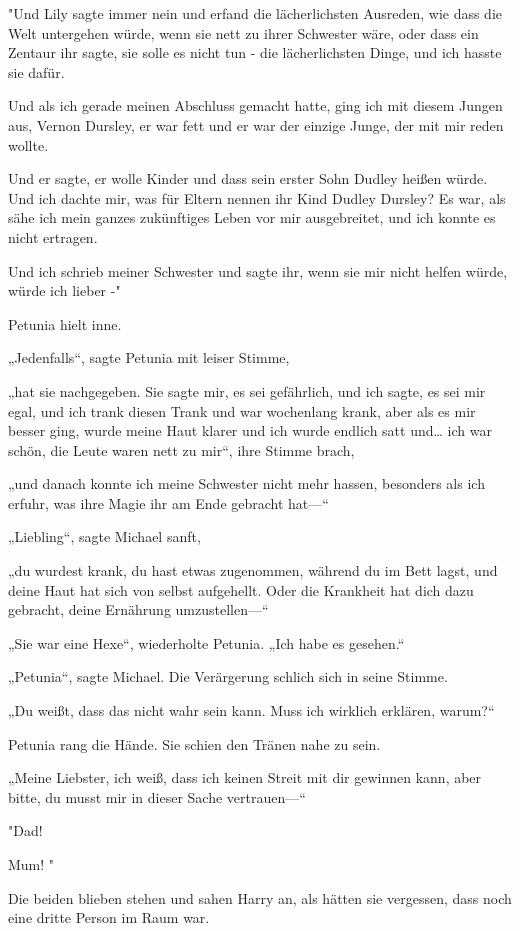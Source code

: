 {"Und Lily sagte immer nein und erfand die lächerlichsten Ausreden, wie dass die Welt untergehen würde, wenn sie nett zu ihrer Schwester wäre, oder dass ein Zentaur ihr sagte, sie solle es nicht tun - die lächerlichsten Dinge, und ich hasste sie dafür.

Und als ich gerade meinen Abschluss gemacht hatte, ging ich mit diesem Jungen aus, Vernon Dursley, er war fett und er war der einzige Junge, der mit mir reden wollte.

Und er sagte, er wolle Kinder und dass sein erster Sohn Dudley heißen würde. Und ich dachte mir, was für Eltern nennen ihr Kind Dudley Dursley? Es war, als sähe ich mein ganzes zukünftiges Leben vor mir ausgebreitet, und ich konnte es nicht ertragen.

Und ich schrieb meiner Schwester und sagte ihr, wenn sie mir nicht helfen würde, würde ich lieber -"

Petunia hielt inne.

„Jedenfalls“, sagte Petunia mit leiser Stimme,

„hat sie nachgegeben. Sie sagte mir, es sei gefährlich, und ich sagte, es sei mir egal, und ich trank diesen Trank und war wochenlang krank, aber als es mir besser ging, wurde meine Haut klarer und ich wurde endlich satt und… ich war schön, die Leute waren nett zu mir“, ihre Stimme brach,

„und danach konnte ich meine Schwester nicht mehr hassen, besonders als ich erfuhr, was ihre Magie ihr am Ende gebracht hat—“

„Liebling“, sagte Michael sanft,

„du wurdest krank, du hast etwas zugenommen, während du im Bett lagst, und deine Haut hat sich von selbst aufgehellt. Oder die Krankheit hat dich dazu gebracht, deine Ernährung umzustellen—“

„Sie war eine Hexe“, wiederholte Petunia. „Ich habe es gesehen.“

„Petunia“, sagte Michael. Die Verärgerung schlich sich in seine Stimme.

„Du weißt, dass das nicht wahr sein kann. Muss ich wirklich erklären, warum?“

Petunia rang die Hände. Sie schien den Tränen nahe zu sein.

„Meine Liebster, ich weiß, dass ich keinen Streit mit dir gewinnen kann, aber bitte, du musst mir in dieser Sache vertrauen—“

"Dad!

Mum! "

Die beiden blieben stehen und sahen Harry an, als hätten sie vergessen, dass noch eine dritte Person im Raum war.

}
